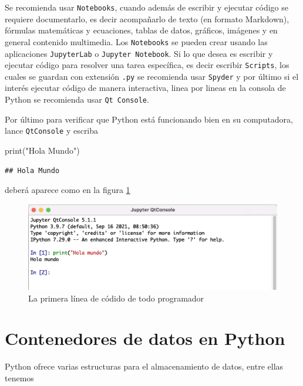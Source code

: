 \documentclass[
]{book}
\newenvironment{Shaded}{\begin{snugshade}}{\end{snugshade}}
\newcommand{\BuiltInTok}[1]{#1}
\newcommand{\NormalTok}[1]{#1}
\newcommand{\StringTok}[1]{\textcolor[rgb]{0.31,0.60,0.02}{#1}}
\theoremstyle{definition}
\theoremstyle{definition}
\theoremstyle{definition}
\theoremstyle{definition}
\theoremstyle{remark}
\begin{document}
Se recomienda usar \texttt{Notebooks}, cuando además de escribir y ejecutar código se requiere documentarlo, es decir acompañarlo de texto (en formato Markdown), fórmulas matemáticas y ecuaciones, tablas de datos, gráficos, imágenes y en general contenido multimedia. Los \texttt{Notebooks} se pueden crear usando las aplicaciones \texttt{JupyterLab} o \texttt{Jupyter\ Notebook}. Si lo que desea es escribir y ejecutar código para resolver una tarea específica, es decir escribir \texttt{Scripts}, los cuales se guardan con extensión \texttt{.py} se recomienda usar \texttt{Spyder} y por último si el interés ejecutar código de manera interactiva, linea por lineas en la consola de Python se recomienda usar \texttt{Qt\ Console}.

Por último para verificar que Python está funcionando bien en su computadora, lance \texttt{QtConsole} y escriba

\begin{Shaded}
\begin{Highlighting}[]
\BuiltInTok{print}\NormalTok{(}\StringTok{"Hola Mundo"}\NormalTok{) }
\end{Highlighting}
\end{Shaded}

\begin{verbatim}
## Hola Mundo
\end{verbatim}

deberá aparece como en la figura \ref{fig:holamundo}

\begin{figure}
\includegraphics[width=0.95\linewidth]{HolaMundo} \caption{La primera línea de códido de todo programador}\label{fig:holamundo}
\end{figure}

\hypertarget{contenedores-de-datos-en-python}{%
\chapter{Contenedores de datos en Python}\label{contenedores-de-datos-en-python}}

Python ofrece varias estructuras para el almacenamiento de datos, entre ellas tenemos
\end{document}
